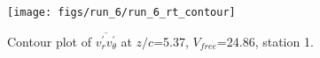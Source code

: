 \begin{figure}[H]
\centering
\texttt{[image: figs/run\_6/run\_6\_rt\_contour]}
\caption{Contour plot of $\overline{v_{r}^{\prime} v_{\theta}^{\prime}}$ at $z/c$=5.37, $V_{free}$=24.86, station 1.}
\label{fig:run_6_rt_contour}
\end{figure}


